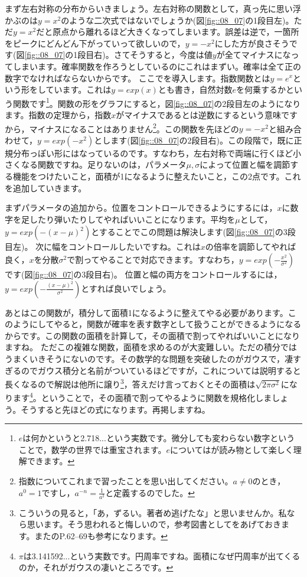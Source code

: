 \documentclass{ltjbook}
\begin{document}
まず左右対称の分布からいきましょう。左右対称の関数として，真っ先に思い浮かぶのは$y=x^2$のような二次式ではないでしょうか(図\ref{fig::08_07}の1段目左)。ただ$y=x^2$だと原点から離れるほど大きくなってしまいます。誤差は逆で，一箇所をピークにどんどん下がっていって欲しいので，$y=-x^2$にした方が良さそうです(図\ref{fig::08_07}の1段目右)。さてそうすると，今度は値$y$が全てマイナスになってしまいます。確率関数を作ろうとしているのにこれはまずい。確率は全て正の数字でなければならないからです。
ここでを導入します。指数関数とは$y=e^x$という形をしています。これは$y=exp(x)$とも書き，自然対数$e$を何乗するかという関数です\footnote{$e$は何かというと2.718...という実数です。微分しても変わらない数字ということで，数学の世界では重宝されます。$e$については\citet{Maor_Eli2019-01-10}が読み物として楽しく理解できます。}。関数の形をグラフにすると，図\ref{fig::08_07}の2段目左のようになります。指数の定理から，指数$x$がマイナスであるとは逆数にするという意味ですから，マイナスになることはありません\footnote{指数についてこれまで習ったことを思い出してください。$a\neq 0$のとき，$a^0=1$ですし，$a^{-n}=\frac{1}{a^2}$と定義するのでした。}。この関数を先ほどの$y=-x^2$と組み合わせて，$y=exp(-x^2)$とします(図\ref{fig::08_07}の2段目右)。この段階で，既に正規分布っぽい形にはなっているのです。すなわち，左右対称で両端に行くほど小さくなる関数ですね。足りないのは，パラメータ$\mu,\sigma$によって位置と幅を調節する機能をつけたいこと，面積が1になるように整えたいこと，この2点です。これを追加していきます。

まずパラメータの追加から。位置をコントロールできるようにするには，$x$に数字を足したり弾いたりしてやればいいことになります。平均を$\mu$として，$y=exp(-(x-\mu)^2)$とすることでこの問題は解決します(図\ref{fig::08_07}の3段目左)。
次に幅をコントロールしたいですね。これは$x$の倍率を調節してやれば良く，$x$を分散$\sigma^2$で割ってやることで対応できます。すなわち，$y=exp(-\frac{x^2}{\sigma^2})$です(図\ref{fig::08_07}の3段目右)。
位置と幅の両方をコントロールするには，$y=exp(-\frac{(x-\mu)^2}{\sigma^2})$とすれば良いでしょう。

あとはこの関数が，積分して面積1になるように整えてやる必要があります。このようにしてやると，関数が確率を表す数字として扱うことができるようになるからです。この関数の面積を計算して，その面積で割ってやればいいことになりますね。
ただこの複雑な関数，面積を求めるのが大変難しい。ただの積分ではうまくいきそうにないのです。その数学的な問題を突破したのがガウスで，凄すぎるのでガウス積分と名前がついているほどですが，これについては説明すると長くなるので解説は他所に譲り\footnote{こういうの見ると，「あ，ずるい。著者め逃げたな」と思いませんか。私なら思います。そう思われると悔しいので，参考図書として\citet{西内201712}をあげておきます。また\citet{長沼201611}のP.62--69も参考になります。}，答えだけ言っておくとその面積は$\sqrt{2\pi \sigma^2}$になります\footnote{$\pi$は3.141592...という実数です。円周率ですね。面積になぜ円周率が出てくるのか，それがガウスの凄いところです。}。ということで，その面積で割ってやるように関数を規格化しましょう。そうすると先ほどの式になります。再掲しますね。
\end{document}
